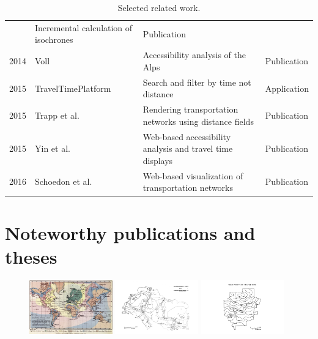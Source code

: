 \begin{table}[htp]
\begin{tabular}{r|l|l|l}
        & Incremental calculation of isochrones
        & Publication \\
      2014
        & Voll \cite{vollerreichbarkeiten}
        & Accessibility analysis of the Alps
        & Publication \\
      2015
        & TravelTimePlatform \cite{TravelTimePlatform}
        & Search and filter by time not distance
        & Application \\
      2015
        & Trapp et al. \cite{Trapp2015}
        & Rendering transportation networks using distance fields
        & Publication \\
      2015
        & Yin et al. \cite{Yin2015}
        & Web-based accessibility analysis and travel time displays
        & Publication \\
      2016
        & Schoedon et al. \cite{STHD2016}
        & Web-based visualization of transportation networks
        & Publication \\
    \end{tabular}
    \caption{Selected related work.}
    \label{tab:overv:relat}
  \end{table}

  \section{Noteworthy publications and theses}
    \label{sec:overv:publc}

    \begin{figure}[ht]
      {\includegraphics[width=0.32\textwidth]{./img/overv-isopc.jpg}}
      \hfill
      {\includegraphics[width=0.32\textwidth]{./img/overv-nodac.png}}
      \hfill
      {\includegraphics[width=0.32\textwidth]{./img/overv-maptt.png}}
      \label{fig:overv:1}
    \end{figure}

